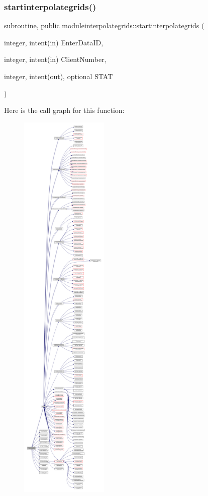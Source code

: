 \subsubsection{\texorpdfstring{startinterpolategrids()}{startinterpolategrids()}}
{\footnotesize\ttfamily subroutine, public moduleinterpolategrids\+::startinterpolategrids (\begin{DoxyParamCaption}\item[{integer, intent(in)}]{Enter\+Data\+ID,  }\item[{integer, intent(in)}]{Client\+Number,  }\item[{integer, intent(out), optional}]{S\+T\+AT }\end{DoxyParamCaption})}

Here is the call graph for this function\+:\nopagebreak
\begin{figure}[H]
\begin{center}
\leavevmode
\includegraphics[height=550pt]{namespacemoduleinterpolategrids_af563db97a33c679a4f2a61c77a82a50f_cgraph}
\end{center}
\end{figure}
